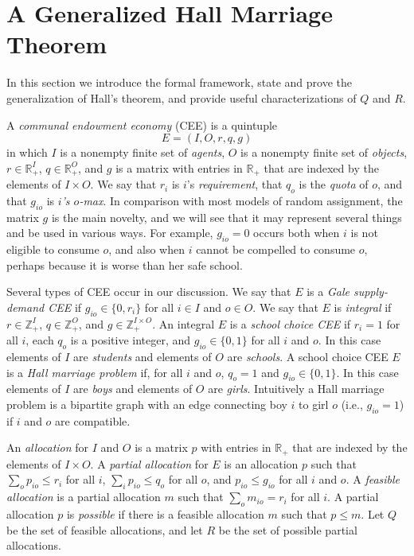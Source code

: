 \documentclass[12pt]{article}
\theoremstyle{definition}
\renewcommand{\Re}{\mathbb{R}}
\newcommand{\In}{\mathbb{Z}}
\begin{document}
\section{A Generalized Hall Marriage Theorem} \label{sec:GenHall}

In this section we introduce the formal framework, state and prove the generalization of Hall's theorem, and provide useful characterizations of $Q$ and $R$.

A \emph{communal endowment economy} (CEE) is a
quintuple $$E = (I,O,r,q,g)$$ in which $I$ is a nonempty finite set of \emph{agents}, $O$ is a nonempty finite set of \emph{objects}, $r \in \Re_+^I$, $q \in \Re_+^O$, and $g$ is a matrix with entries in $\Re_+$ that are indexed by the elements of $I \times O$.  We say that $r_i$ is
$i$'s \emph{requirement}, that $q_o$ is the \emph{quota} of $o$, and that $g_{io}$ is \emph{$i$'s $o$-max}.  In comparison with most models of random assignment, the matrix $g$ is the main novelty, and we will see that it may represent several things and be used in various ways.  For example, $g_{io} = 0$ occurs both when $i$ is not eligible to consume $o$, and also when $i$ cannot be compelled to consume $o$, perhaps because it is worse than her safe school.

Several types of CEE occur in our discussion.  We say that $E$ is a \emph{Gale supply-demand CEE} if $g_{io} \in \{0,r_i\}$ for all $i \in I$ and $o \in O$.
We say that $E$ is \emph{integral} if $r \in \In_+^I$, $q \in \In_+^O$, and $g \in \In_+^{I \times O}$.
An integral $E$ is a \emph{school choice CEE} if $r_i = 1$ for all $i$, each $q_o$ is a positive integer, and $g_{io} \in \{0,1\}$ for all $i$ and $o$.   In this case elements of $I$ are \emph{students} and elements of $O$ are \emph{schools}. A school choice CEE $E$ is a  \emph{Hall marriage problem} if,  for all $i$ and $o$, $q_o = 1$ and $g_{io} \in \{0,1\}$.   In this case elements of $I$ are \emph{boys} and elements of $O$ are \emph{girls}.
Intuitively a Hall marriage problem is a bipartite graph with an edge connecting boy $i$ to girl $o$ (i.e., $g_{io} = 1$) if $i$ and $o$ are compatible.  

An \emph{allocation} for $I$ and $O$ is a
matrix $p$  with entries in $\Re_+$ that are indexed by the elements of $I \times O$.  A \emph{partial allocation} for $E$ is an allocation $p$ such that $\sum_o p_{io} \le r_i$ for all $i$, $\sum_i p_{io} \le q_o$ for all $o$, and $p_{io} \le g_{io}$ for all $i$ and $o$. A \emph{feasible allocation} is a partial allocation $m$ such that $\sum_o m_{io} = r_i$ for all $i$. 
A partial allocation $p$ is \emph{possible} if there is a feasible allocation $m$ such that $p \le m$.
Let $Q$ be the set of feasible allocations, and let $R$ be the set of possible partial allocations.
\end{document}
